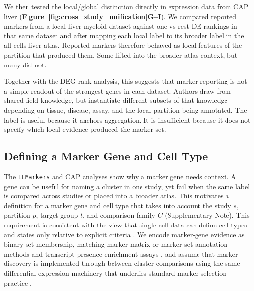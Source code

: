 \documentclass[10pt,twocolumn]{article}
\theoremstyle{plain}
\theoremstyle{definition}
\theoremstyle{remark}
\begin{document}
We then tested the local/global distinction directly in expression data from CAP liver (\textbf{Figure~\ref{fig:cross_study_unification}G--I}). We compared reported markers from a local liver myeloid dataset against one-vs-rest DE rankings in that same dataset and after mapping each local label to its broader label in the all-cells liver atlas.  Reported markers therefore behaved as local features of the partition that produced them. Some lifted into the broader atlas context, but many did not.

Together with the DEG-rank analysis, this suggests that marker reporting is not a simple readout of the strongest genes in each dataset. Authors draw from shared field knowledge, but instantiate different subsets of that knowledge depending on tissue, disease, assay, and the local partition being annotated. The label is useful because it anchors aggregation. It is insufficient because it does not specify which local evidence produced the marker set.

\subsection*{Defining a Marker Gene and Cell Type}

The \texttt{LLMarkers} and CAP analyses show why a marker gene needs context. A gene can be useful for naming a cluster in one study, yet fail when the same label is compared across studies or placed into a broader atlas. This motivates a definition for a marker gene and cell type that takes into account the study $s$, partition $p$, target group $t$, and comparison family $C$ (Supplementary Note). This requirement is consistent with the view that single-cell data can define cell types and states only relative to explicit criteria \citep{Trapnell2015CellTypesStates,Zeng2022CellType}. We encode marker-gene evidence as binary set membership, matching marker-matrix or marker-set annotation methods \citep{Pliner2019Garnett,Zhang2019CellAssign,Ianevski_2022,Bi2026BinarySPA} and transcript-presence enrichment assays \citep{Abay2024PERFF}, and assume that marker discovery is implemented through between-cluster comparisons using the same differential-expression machinery that underlies standard marker selection practice \citep{Robinson_2009,Pullin2024MarkerSelection}.
\end{document}
